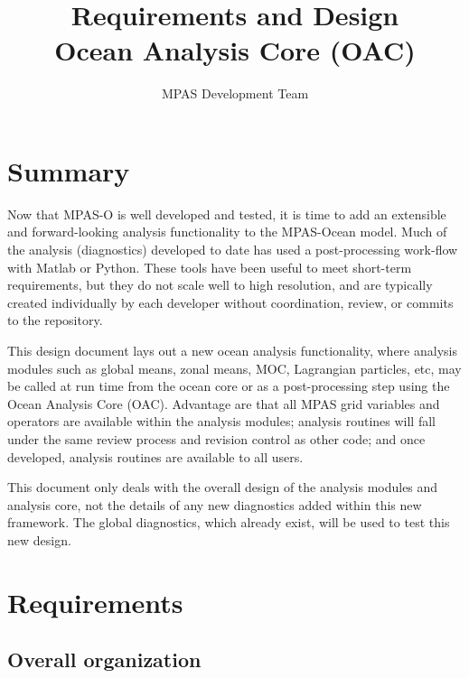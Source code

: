 \documentclass[11pt]{report}
\begin{document}
\title{
Requirements and Design\\
Ocean Analysis Core (OAC)}
\author{MPAS Development Team}

\maketitle
\tableofcontents


\chapter{Summary}

Now that MPAS-O is well developed and tested, it is time to add an extensible and forward-looking analysis functionality to the MPAS-Ocean model.  Much of the analysis (diagnostics) developed to date has used a post-processing work-flow with Matlab or Python.  These tools have been useful to meet short-term requirements, but they do not scale well to high resolution, and are typically created individually by each developer without coordination, review, or commits to the repository.

This design document lays out a new ocean analysis functionality, where analysis modules such as global means, zonal means, MOC, Lagrangian particles, etc, may be called at run time from the ocean core or as a post-processing step using the Ocean Analysis Core (OAC).  Advantage are that all MPAS grid variables and operators are available within the analysis modules; analysis routines will fall under the same review process and revision control as other code; and once developed, analysis routines are available to all users.

This document only deals with the overall design of the analysis modules and analysis core, not the details of any new diagnostics added within this new framework.  The global diagnostics, which already exist, will be used to test this new design. 


\chapter{Requirements}

\section{Overall organization}
\end{document}
